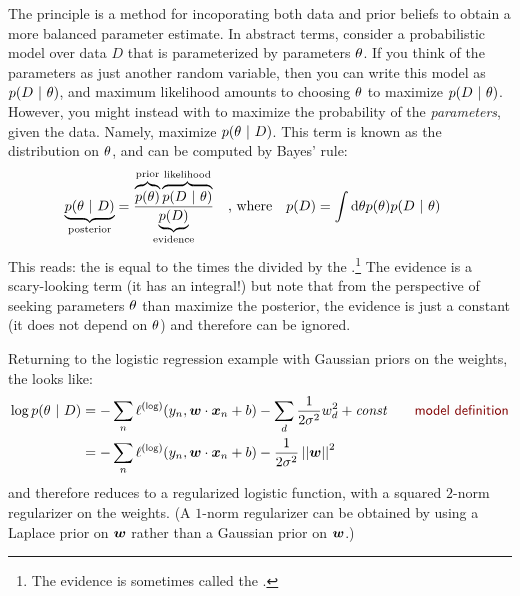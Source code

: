 The  principle is a method for
incoporating both data and prior beliefs to obtain a more balanced
parameter estimate.  In abstract terms, consider a probabilistic model
over data $D$ that is parameterized by parameters $\theta$.  If you think
of the parameters as just another random variable, then you can write
this model as $p(D \textrm{~}\arrowvert\textrm{~} \theta)$, and maximum likelihood amounts to
choosing $\theta$ to maximize $p(D \textrm{~}\arrowvert\textrm{~} \theta)$.  However, you might instead
with to maximize the probability of the \emph{parameters}, given the
data.  Namely, maximize $p(\theta \textrm{~}\arrowvert\textrm{~} D)$.  This term is known as the
 distribution on $\theta$, and can be computed by
Bayes' rule:
%
\begin{align}
  \underbrace{p(\theta \textrm{~}\arrowvert\textrm{~} D)}_{\text{posterior}} 
  &= \frac {
       \overbrace{p(\theta)}^{\text{prior}}
       \overbrace{p(D \textrm{~}\arrowvert\textrm{~} \theta)}^{\text{likelihood}}
     } {
       \underbrace{p(D)}_{\text{evidence}}
     }
 \quad\text{, where}\quad
 p(D) = \int \textrm{d}\theta p(\theta) p(D \textrm{~}\arrowvert\textrm{~} \theta)
\end{align}
%
This reads: the  is equal to the 
times the  divided by the
.\footnote{The evidence is sometimes called the
  .}  The evidence is a scary-looking
term (it has an integral!) but note that from the perspective of
seeking parameters $\theta$ than maximize the posterior, the evidence is
just a constant (it does not depend on $\theta$) and therefore can be
ignored.

Returning to the logistic regression example with Gaussian priors on
the weights, the  looks like:
%
\begin{align}
   \log p(\th \| D)
&= - \sum_n \ell\xth{log}(y_n, \dotp{\vw}{\vx_n} + b)
   - \sum_d \frac 1 {2 \si^2} w_d^2
   + \textit{const}
   \becauseof{model definition}\\
&= - \sum_n \ell\xth{log}(y_n, \dotp{\vw}{\vx_n} + b)
   - \frac 1 {2 \si^2} \norm{\vw}^2
\end{align}
%
and therefore reduces to a regularized logistic function, with a
squared $2$-norm regularizer on the weights.  (A $1$-norm regularizer
can be obtained by using a Laplace prior on ${\boldsymbol{w}}$ rather than a
Gaussian prior on ${\boldsymbol{w}}$.)



